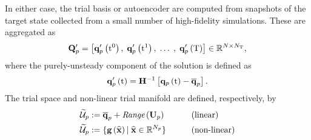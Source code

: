%
In either case, the trial basis or autoencoder are computed from snapshots of the target state collected from a small number of high-fidelity simulations. These are aggregated as
%
\begin{equation}\label{eq:primSnapMat}
	\primDataMatUns = \left[ \primFuncUns{\initTime}, \; \primFuncUns{\timeVar^1}, \; \hdots \; , \; \primFuncUns{\finalTime} \right] \inRTwo{\numDOF}{\numSnaps},
\end{equation}
%
where the purely-unsteady component of the solution is defined as
%
\begin{equation}\label{eq:primUns}
	\primFuncUns{\timeVar} = \primScaleInv \left[\primFunc{\timeVar} - \primVecCent\right].
\end{equation}
%
The trial space and non-linear trial manifold are defined, respectively, by
%
\begin{alignat}{2}
    \primTrialSpace &\defEq \primVecCent + \textit{Range}\left(\primTrial\right) \qquad &&\text{(linear)}\\
    \primTrialSpace &\defEq \{\decoderFunc{\nnInputCoef} \vert \; \nnInputCoef \inROne{\numPrimModes} \} \qquad &&\text{(non-linear)}
\end{alignat}
%

